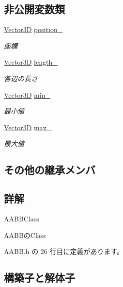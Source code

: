 \subsection*{非公開変数類}
\begin{DoxyCompactItemize}
\item 
\mbox{\hyperlink{class_vector3_d}{Vector3D}} \mbox{\hyperlink{class_a_a_b_b_a3ca25dc046fa31d1baafa8c8a1174302}{position\+\_\+}}
\begin{DoxyCompactList}\small\item\em 座標 \end{DoxyCompactList}\item 
\mbox{\hyperlink{class_vector3_d}{Vector3D}} \mbox{\hyperlink{class_a_a_b_b_abade307dbbfa9c74638fde5387d629f8}{length\+\_\+}}
\begin{DoxyCompactList}\small\item\em 各辺の長さ \end{DoxyCompactList}\item 
\mbox{\hyperlink{class_vector3_d}{Vector3D}} \mbox{\hyperlink{class_a_a_b_b_a682f7bc02fc950a24ce8a8e512e4eb52}{min\+\_\+}}
\begin{DoxyCompactList}\small\item\em 最小値 \end{DoxyCompactList}\item 
\mbox{\hyperlink{class_vector3_d}{Vector3D}} \mbox{\hyperlink{class_a_a_b_b_a7f8dca79cab056729bde7139b219fcbe}{max\+\_\+}}
\begin{DoxyCompactList}\small\item\em 最大値 \end{DoxyCompactList}\end{DoxyCompactItemize}
\subsection*{その他の継承メンバ}


\subsection{詳解}
A\+A\+B\+B\+Class 

A\+A\+B\+Bの\+Class 

 A\+A\+B\+B.\+h の 26 行目に定義があります。



\subsection{構築子と解体子}
\mbox{\label{class_a_a_b_b_afd5f4956a2043597167ff66821f7b223}} 
